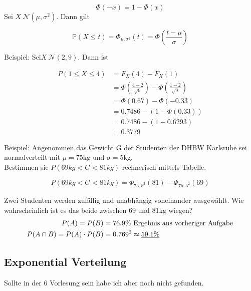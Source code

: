\[\Phi(-x)=1-\Phi(x)\]
Sei $X~\mathcal{N} (\mu,\sigma^2)$. Dann gilt

\[\mathbb{P} (X\leq t)=\Phi_{\mu ,\sigma ^2}(t)=\Phi\left( \frac{t-\mu}{\sigma} \right)\]

Beispiel: Sei$X~\mathcal{N} (2,9)$. Dann ist

\begin{align}
    P(1\leq X\leq 4)&=F_X(4)-F_X(1)\\
    &=\Phi\left(\frac{4-2}{\sqrt{9}}\right)-\Phi\left(\frac{1-2}{\sqrt{9} } \right)\\
    &=\Phi(0.67)-\Phi(-0.33)\\
    &=0.7486-(1-\Phi(0.33))\\
    &=0.7486-(1-0.6293)\\
    &=0.3779
\end{align}

Beispiel: Angenommen das Gewicht G der Studenten der DHBW Karlsruhe sei normalverteilt mit $\mu =75$kg und $\sigma=5$kg.\\

Bestimmen sie $P(69kg<G<81kg)$ rechnerisch mittels Tabelle.

\[P(69kg<G<81kg)=\Phi_{75,5^2}(81)-\Phi_{75,5^2}(69)\]

Zwei Studenten werden zufällig und unabhängig voneinander ausgewählt. Wie wahrscheinlich ist es das beide zwischen 69 und 81kg wiegen?
\begin{align}
    P(A)=P(B)&=76.9\%\textrm{ Ergebnis aus vorheriger Aufgabe}\\
    P(A\cap B)=P(A)\cdot P(B)&=0.769^2\thickapprox \underline{59.1\% }
\end{align}


\subsection{Exponential Verteilung}

Sollte in der 6 Vorlesung sein habe ich aber noch nicht gefunden.

